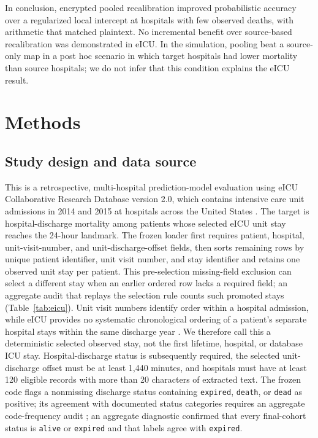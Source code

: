 \documentclass[11pt]{article}
\begin{document}
In conclusion, encrypted pooled recalibration improved probabilistic accuracy over a regularized local intercept at hospitals with few observed deaths, with arithmetic that matched plaintext. No incremental benefit over source-based recalibration was demonstrated in eICU. In the simulation, pooling beat a source-only map in a post hoc scenario in which target hospitals had lower mortality than source hospitals; we do not infer that this condition explains the eICU result.

\section*{Methods}
\subsection*{Study design and data source}\label{study-design-and-data-source}

This is a retrospective, multi-hospital prediction-model evaluation using eICU Collaborative Research Database version 2.0, which contains intensive care unit admissions in 2014 and 2015 at hospitals across the United States \cite{r1,r2}. The target is hospital-discharge mortality among patients whose selected eICU unit stay reaches the 24-hour landmark. The frozen loader first requires patient, hospital, unit-visit-number, and unit-discharge-offset fields, then sorts remaining rows by unique patient identifier, unit visit number, and stay identifier and retains one observed unit stay per patient. This pre-selection missing-field exclusion can select a different stay when an earlier ordered row lacks a required field; an aggregate audit that replays the selection rule counts such promoted stays (Table~\ref{tab:eicu}). Unit visit numbers identify order within a hospital admission, while eICU provides no systematic chronological ordering of a patient's separate hospital stays within the same discharge year \cite{r11}. We therefore call this a deterministic selected observed stay, not the first lifetime, hospital, or database ICU stay. Hospital-discharge status is subsequently required, the selected unit-discharge offset must be at least 1,440 minutes, and hospitals must have at least 120 eligible records with more than 20 characters of extracted text. The frozen code flags a nonmissing discharge status containing \texttt{expired}, \texttt{death}, or \texttt{dead} as positive; its agreement with documented status categories requires an aggregate code-frequency audit \cite{r11}; an aggregate diagnostic confirmed that every final-cohort status is \texttt{alive} or \texttt{expired} and that labels agree with \texttt{expired}.
\end{document}

